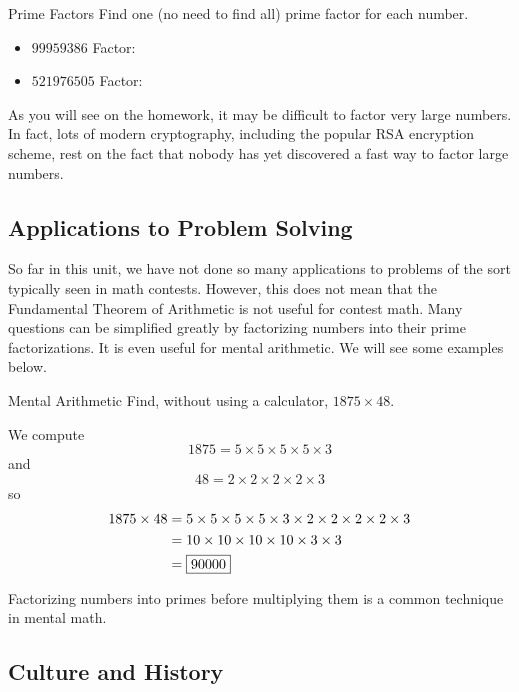 \documentclass[a4paper,10pt]{report}
\begin{document}
\begin{problem}{Prime Factors}
 Find one (no need to find all) prime factor for each number.

 \begin{itemize}
  \item $99959386$ \hfill Factor: 
  \item $521976505$ \hfill Factor: 
 \end{itemize}
\end{problem}

As you will see on the homework, it may be difficult to factor very large
numbers. In fact, lots of modern cryptography, including the popular RSA
encryption scheme, rest on the fact that nobody has yet discovered a fast way to
factor large numbers.

\subsection{Applications to Problem Solving}

So far in this unit, we have not done so many applications to problems of the
sort typically seen in math contests. However, this does not mean that the
Fundamental Theorem of Arithmetic is not useful for contest math. Many questions
can be simplified greatly by factorizing numbers into their prime
factorizations. It is even useful for mental arithmetic. We will see some
examples below.

\begin{problem}{Mental Arithmetic}
 Find, without using a calculator, $1875\times48$.

 \begin{solution}
  We compute \[
   1875 = 5 \times 5 \times 5 \times 5 \times 3
  \] and \[
   48 = 2 \times 2 \times 2 \times 2 \times 3
  \] so \begin{align*}
   1875 \times 48
   &= 5 \times 5 \times 5 \times 5 \times 3 \times 2 \times 2 \times 2 \times 2
   \times 3 \\
   &= 10 \times 10 \times 10 \times 10 \times 3 \times 3 \\
   &= \Ans{90000}
  \end{align*}

  Factorizing numbers into primes before multiplying them is a common technique
  in mental math.
 \end{solution}
\end{problem}

\subsection{Culture and History}
\end{document}
